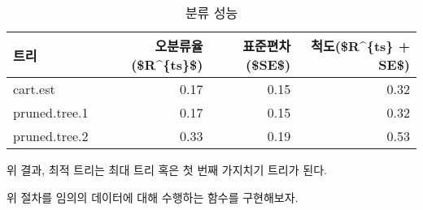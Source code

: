 \documentclass[
]{book}
\begin{document}
\begin{table}

\caption{\label{tab:misclassification-rate-table}분류 성능}
\centering
\begin{tabular}[t]{lrrr}
\toprule
트리 & 오분류율(\$R\textasciicircum{}\{ts\}\$) & 표준편차(\$SE\$) & 척도(\$R\textasciicircum{}\{ts\} + SE\$)\\
\midrule
cart.est & 0.17 & 0.15 & 0.32\\
pruned.tree.1 & 0.17 & 0.15 & 0.32\\
pruned.tree.2 & 0.33 & 0.19 & 0.53\\
\bottomrule
\end{tabular}
\end{table}

위 결과, 최적 트리는 최대 트리 혹은 첫 번째 가지치기 트리가 된다.

위 절차를 임의의 데이터에 대해 수행하는 함수를 구현해보자.
\end{document}
